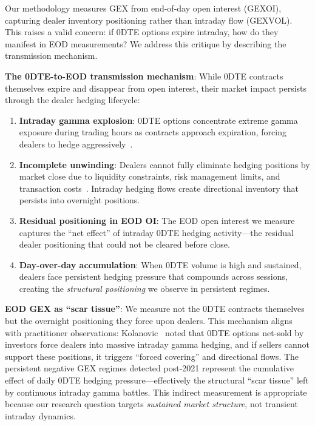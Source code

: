 \vspace{0.2cm}

Our methodology measures GEX from end-of-day open interest (GEX\textunderscore OI), capturing dealer inventory positioning rather than intraday flow (GEX\textunderscore VOL). This raises a valid concern: if 0DTE options expire intraday, how do they manifest in EOD measurements? We address this critique by describing the transmission mechanism.

\vspace{0.2cm}

\noindent\textbf{The 0DTE-to-EOD transmission mechanism}: While 0DTE contracts themselves expire and disappear from open interest, their market impact persists through the dealer hedging lifecycle:

\vspace{0.1cm}

\begin{enumerate}
\item \textbf{Intraday gamma explosion}: 0DTE options concentrate extreme gamma exposure during trading hours as contracts approach expiration, forcing dealers to hedge aggressively~\cite{dim2025zero}.

\item \textbf{Incomplete unwinding}: Dealers cannot fully eliminate hedging positions by market close due to liquidity constraints, risk management limits, and transaction costs~\cite{garleanu2013dynamic}. Intraday hedging flows create directional inventory that persists into overnight positions.

\item \textbf{Residual positioning in EOD OI}: The EOD open interest we measure captures the ``net effect'' of intraday 0DTE hedging activity—the residual dealer positioning that could not be cleared before close.

\item \textbf{Day-over-day accumulation}: When 0DTE volume is high and sustained, dealers face persistent hedging pressure that compounds across sessions, creating the \textit{structural positioning} we observe in persistent regimes.
\end{enumerate}

\vspace{0.2cm}

\noindent\textbf{EOD GEX as ``scar tissue''}: We measure not the 0DTE contracts themselves but the overnight positioning they force upon dealers. This mechanism aligns with practitioner observations: Kolanovic~\cite{kolanovic2023volmageddon} noted that 0DTE options net-sold by investors force dealers into massive intraday gamma hedging, and if sellers cannot support these positions, it triggers ``forced covering'' and directional flows. The persistent negative GEX regimes detected post-2021 represent the cumulative effect of daily 0DTE hedging pressure—effectively the structural ``scar tissue'' left by continuous intraday gamma battles. This indirect measurement is appropriate because our research question targets \textit{sustained market structure}, not transient intraday dynamics.

